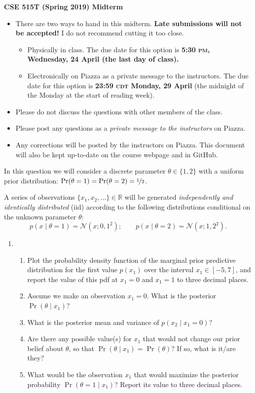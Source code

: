 \documentclass{article}
\newcommand{\acro}[1]{\textsc{\MakeLowercase{#1}}}
\newcommand{\given}{\mid}
\newcommand{\mc}[1]{\mathcal{#1}}
\newcommand{\R}{\mathbb{R}}
\begin{document}
{\large \textbf{CSE 515T (Spring 2019) Midterm}}
\begin{itemize}
\item
  There are two ways to hand in this midterm.  \textbf{Late submissions will not
    be accepted!}  I do not recommend cutting it too close.
  \begin{itemize}
  \item Physically in class.  The due date for this option is \textbf{5:30
    \acro{PM}, Wednesday, 24 April (the last day of class).}
  \item Electronically on Piazza as a private message to the instructors. The
    due date for this option is \textbf{23:59 \acro{CDT} Monday, 29 April} (the
    midnight of the Monday at the start of reading week).
  \end{itemize}
\item
  Please do not discuss the questions with other members of the class.
\item
  Please post any questions as a \emph{private message to the instructors} on
  Piazza.
\item
  Any corrections will be posted by the instructors on Piazza. This document
  will also be kept up-to-date on the course webpage and in GitHub.
\end{itemize}

\clearpage

In this question we will consider a discrete parameter $\theta \in \{1, 2\}$
with a uniform prior distribution: $\Pr(\theta = 1) = \Pr(\theta = 2) =
\nicefrac{1}{2}$.

A series of observations $\{x_1, x_2, \dotsc\} \in \R$ will be generated
\emph{independently and identically distributed} (iid) according to the
following distributions conditional on the unknown parameter $\theta$:
\[
  p(x \given \theta = 1) = \mc{N}(x; 0, 1^2);
  \qquad
  p(x \given \theta = 2) = \mc{N}(x; 1, 2^2).
\]

\begin{enumerate}
\item
  \begin{enumerate}
  \item
    Plot the probability density function of the marginal prior predictive
    distribution for the first value $p(x_1)$ over the interval $x_1 \in [-5,
      7]$, and report the value of this pdf at $x_1 = 0$ and $x_1 = 1$ to three
    decimal places.
  \item
    Assume we make an observation $x_1 = 0$. What is the posterior $\Pr(\theta
    \given x_1)$?
  \item
    What is the posterior mean and variance of $p(x_2 \given x_1 = 0)$?
  \item
    Are there any possible value(s) for $x_1$ that would not change our prior
    belief about $\theta$, so that $\Pr(\theta \given x_1) = \Pr(\theta)$? If
    so, what is it/are they?
  \item
    What would be the observation $x_1$ that would maximize the posterior
    probability $\Pr(\theta = 1 \given x_1)$? Report its value to three decimal
    places.
  \end{enumerate}
\end{enumerate}
\end{document}
